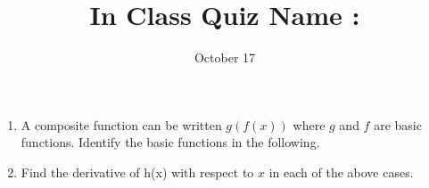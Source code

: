 \documentclass[11pt]{article}
\begin{document}
\title{In Class Quiz \hfill Name : \underline{\hspace{3cm}}}
\date{October 17}
\maketitle
\begin{enumerate}
\item A composite function can be written $g(f(x))$ where $g$ and $f$ are basic functions.  Identify the basic functions in the following.
\begin{enumerate}
\item $h(x)=e^{-x^2}$
\item $h(x)=(x^2+3x-2}^4$
\item $h(x)=sin(log(2*x+2))$
\end{enumerate}
\item Find the derivative of h(x) with respect to $x$ in each of the above cases.
\end{enumerate}
\end{document}
